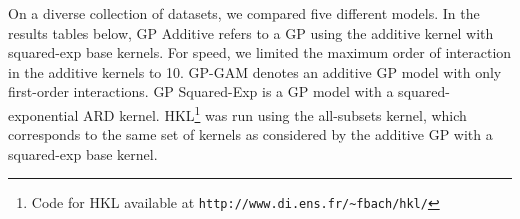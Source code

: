 
%
%


On a diverse collection of datasets, we compared five different models.  In the results tables below, GP Additive refers to a GP using the additive kernel with squared-exp base kernels.  For speed, we limited the maximum order of interaction in the additive kernels to 10.  GP-GAM denotes an additive GP model with only first-order interactions.  GP Squared-Exp is a GP model with a squared-exponential ARD kernel.  HKL\footnote{Code for HKL available at \texttt{http://www.di.ens.fr/\textasciitilde fbach/hkl/}} was run using the all-subsets kernel, which corresponds to the same set of kernels as considered by the additive GP with a squared-exp base kernel.     

